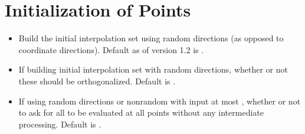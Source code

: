 \documentclass[letterpaper,10pt,english]{sphinxmanual}
\begin{document}
\section{Initialization of Points}
\label{\detokenize{advanced:initialization-of-points}}\begin{itemize}
\item {} 
\sphinxAtStartPar
{} \sphinxhyphen{} Build the initial interpolation set using random directions (as opposed to coordinate directions). Default as of version 1.2 is .

\item {} 
\sphinxAtStartPar
{} \sphinxhyphen{} If building initial interpolation set with random directions, whether or not these should be orthogonalized. Default is .

\item {} 
\sphinxAtStartPar
{} \sphinxhyphen{} If using random directions or non\sphinxhyphen{}random with input  at most , whether or not to ask for all  to be evaluated at all points without any intermediate processing. Default is .

\end{itemize}
\end{document}
